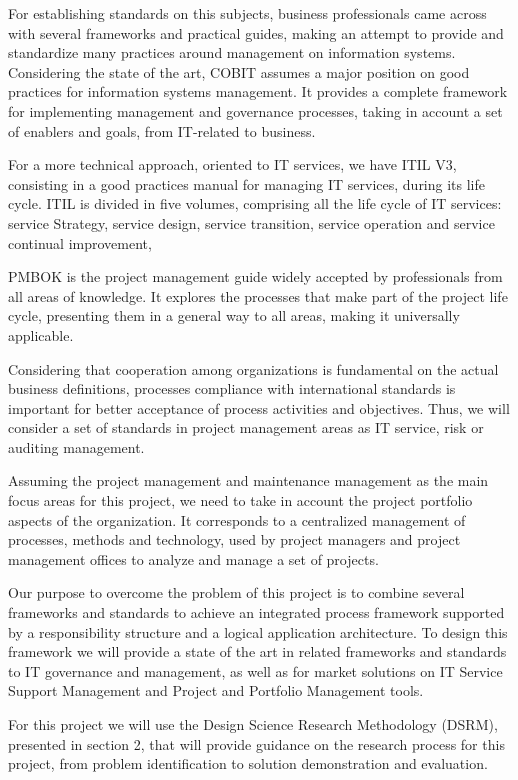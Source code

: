 For establishing standards on this subjects, business professionals came across with several frameworks and practical guides, making an attempt to provide and standardize many practices around management on information systems. Considering the state of the art, COBIT assumes a major position on good practices for information systems management. It provides a complete framework for implementing management and governance processes, taking in account a set of enablers and goals, from IT-related to business.\par
For a more technical approach, oriented to IT services, we have ITIL V3, consisting in a good practices manual for managing IT services, during its life cycle. ITIL is divided in five volumes, comprising all the life cycle of IT services: service Strategy, service design, service transition, service operation and service continual improvement,\par
PMBOK is the project management guide widely accepted by professionals from all areas of knowledge. It explores the processes that make part of the project life cycle, presenting them in a general way to all areas, making it universally applicable.\par
Considering that cooperation among organizations is fundamental on the actual business definitions, processes compliance with international standards is important for better acceptance of process activities and objectives. Thus, we will consider a set of standards in project management areas as IT service, risk or auditing management.\par   
Assuming the project management and maintenance management as the main focus areas for this project, we need to take in account the project portfolio aspects of the organization. It corresponds to a centralized management of processes, methods and technology, used by project managers and project management offices to analyze and manage a set of projects.\par
Our purpose to overcome the problem of this project is to combine several frameworks and standards to achieve an integrated process framework supported by a responsibility structure and a logical application architecture. To design this framework we will provide a state of the art in related frameworks and standards to IT governance and management, as well as for market solutions on IT Service Support Management and Project and Portfolio Management tools.\par
For this project we will use the Design Science Research Methodology (DSRM)\cite{DSRM}, presented in section 2, that will provide guidance on the research process for this project, from problem identification to solution demonstration and evaluation.\par
